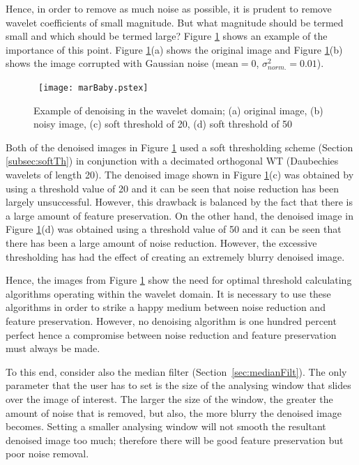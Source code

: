 \documentclass[12pt]{report}
\begin{document}
Hence, in order to remove as much noise as possible, it is prudent to remove
wavelet coefficients of small magnitude. But what magnitude should be termed
small and which should be termed large? Figure \ref{marBaby} shows an example of
the importance of this point. Figure \ref{marBaby}(a) shows the original image
and Figure \ref{marBaby}(b) shows the image corrupted with Gaussian noise 
($\mbox{mean} = 0$, $\sigma_{norm.}^{2} = 0.01$). 
\begin{figure}[p]
	\centerline{ \hbox{
		\texttt{[image: marBaby.pstex]}
	}}
	\caption{Example of denoising in the wavelet domain; (a) original image, 
	(b) noisy image, (c) soft threshold of 20, (d) soft threshold of 50}
	\label{marBaby}
\end{figure}
Both of the denoised images in Figure \ref{marBaby} used a soft thresholding 
scheme (Section \ref{subsec:softTh}) in conjunction with a decimated
orthogonal WT (Daubechies wavelets of length 20).
The denoised image shown in Figure \ref{marBaby}(c) was obtained by using a threshold 
value of 20 and it can be seen that noise reduction has been largely unsuccessful.
However, this drawback is balanced by the fact that there is a large amount
of feature preservation.
On the other hand, the denoised image in Figure \ref{marBaby}(d) was obtained using 
a threshold value of 50 and it can be seen that there has been a large amount of noise reduction.
However, the excessive thresholding has had the effect of creating an extremely
blurry denoised image.



Hence, the images from Figure \ref{marBaby} show the need for optimal threshold 
calculating algorithms operating within the wavelet domain. It is necessary to use these 
algorithms in order to 
strike a happy medium between noise reduction and feature preservation.
However, no denoising algorithm is one hundred percent perfect hence a compromise
between noise reduction and feature preservation must always be made.

To this end, consider also the median filter (Section~\ref{sec:medianFilt}).
The only parameter that the user has to set is the size of the analysing window
that slides over the image of interest. The larger the size of the window,
the greater the amount of noise that is removed, but also, the more blurry the denoised image becomes.
Setting a smaller analysing window will not smooth the resultant denoised image
too much; therefore there will be good feature preservation but poor noise removal.
\end{document}
